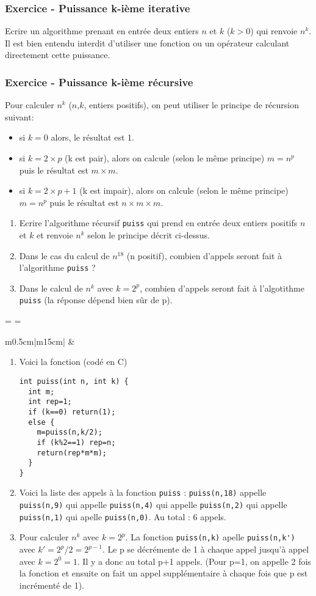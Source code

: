 \documentclass[french,12pt,a4paper,twoside,openright,titlepage]{report}
\newcounter{exo}\stepcounter{exo}
\newcommand\exercice[1]{
\subsubsection*{Exercice \theexo\stepcounter{exo} {#1}}
}
\newlength\Linewidth
\def\findlength{\setlength\Linewidth\linewidth
\addtolength\Linewidth{-4\fboxrule}
\addtolength\Linewidth{-3\fboxsep}
}
\newenvironment{examplebox}{\par\begingroup%
   \setlength{\fboxsep}{5pt}\findlength%
   \setbox0=\vbox\bgroup\noindent%
   \hsize=\Linewidth%
   \begin{minipage}{\Linewidth}\small}%
    {\end{minipage}\egroup%
    \vspace{6pt}%
    \noindent\textcolor{gray20}{\fboxsep2.5pt\fbox%
     {\fboxsep5pt\colorbox{gray05}{\normalcolor\box0}}}%
    \endgroup\par\addvspace{6pt minus 3pt}\noindent%
    \normalcolor\ignorespacesafterend}
\newenvironment{solution}
{
\begin{examplebox}
\begin{center}
\begin{tabular}{m{0.5cm}|m{15cm}|}\cline{2-2}
\rotatebox{90}{Solution}&
\begin{minipage}[H]{\linewidth}
\vspace{0.2cm}
}
{
\vspace{0.2cm}
\end{minipage}
\\\cline{2-2}
\end{tabular}
\end{center}
\end{examplebox}
}
\begin{document}
\exercice{- Puissance k-ième iterative}
Ecrire un algorithme prenant en entrée deux entiers $n$ et $k$ ($k>0$) qui
renvoie $n^k$. Il est bien entendu interdit d'utiliser une fonction ou un
opérateur calculant directement cette puissance.

\exercice {- Puissance k-ième récursive }
Pour calculer $n^k$ ($n$,$k$, entiers positifs), on peut utiliser le principe de récursion suivant:
\begin{itemize}
\item si $k=0$ alors, le résultat est 1.
\item si $k=2 \times p$ (k est pair), alors on calcule (selon le même principe) $m=n^p$ puis le résultat est $m \times m$.
\item si $k=2 \times p + 1$ (k est impair), alors on calcule (selon le même principe) $m=n^p$ puis le résultat est $n \times m \times m$.
\end{itemize}

\begin{enumerate}
\item Ecrire l'algorithme récursif \verb|puiss| qui prend en entrée deux entiers positifs $n$ et $k$ et renvoie $n^k$ selon le principe décrit ci-dessus.
\item Dans le cas du calcul de $n^{18}$ (n positif), combien d'appels seront fait à l'algorithme \verb|puiss| ?
\item Dans le calcul de $n^k$ avec $k=2^p$, combien d'appels seront fait à l'algotithme \verb|puiss| (la réponse dépend bien sûr de p).
\end{enumerate}

\begin{solution}
\begin{enumerate}
\item Voici la fonction (codé en C)
\begin{verbatim}
int puiss(int n, int k) {
  int m; 
  int rep=1;
  if (k==0) return(1);
  else {
    m=puiss(n,k/2);
    if (k%2==1) rep=n;
    return(rep*m*m);
  }
}
\end{verbatim}

\item  Voici la liste des appels à la fonction \verb|puiss| : \verb|puiss(n,18)| appelle \verb|puiss(n,9)| qui appelle \verb|puiss(n,4)| qui appelle \verb|puiss(n,2)|  qui appelle \verb|puiss(n,1)| qui apelle \verb|puiss(n,0)|. Au total : 6 appels.

\item Pour calculer $n^k$ avec $k=2^p$. La fonction \verb|puiss(n,k)| apelle \verb|puiss(n,k')| avec $k'=2^p/2=2^{p-1}$. Le p se décrémente de 1 à chaque appel jusqu'à appel avec $k=2^0=1$. Il y a donc au total p+1 appels. (Pour p=1, on appelle 2 fois la fonction et ensuite on fait un appel supplémentaire à chaque fois que p est incrémenté de 1).
\end{enumerate}
\end{solution}
\end{document}
